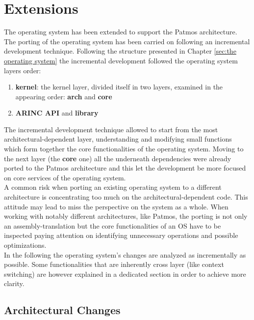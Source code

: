 \chapter{\os Extensions}

The \os operating system has been extended to support the Patmos architecture. The porting of the operating system has been carried on following an incremental development technique. Following the structure presented in Chapter \ref{sec:the operating system} the incremental development followed the operating system layers order:

\begin{enumerate}
	\item \textbf{kernel}: the kernel layer, divided itself in two layers, examined in the appearing order: \textbf{arch} and \textbf{core}
	\item \textbf{ARINC API} and \textbf{library}
\end{enumerate}

The incremental development technique allowed to start from the most architectural-dependent layer, understanding and modifying small functions which form together the core functionalities of the operating system. Moving to the next layer (the \textbf{core} one) all the underneath dependencies were already ported to the Patmos architecture and this let the development be more focused on core services of the operating system.\\

A common risk when porting an existing operating system to a different architecture is concentrating too much on the architectural-dependent code. This attitude may lead to miss the perspective on the system as a whole. When working with notably different architectures, like Patmos, the porting is not only an assembly-translation but the core functionalities of an OS have to be inspected paying attention on identifying unnecessary operations and possible optimizations.\\

In the following the operating system's changes are analyzed as incrementally as possible. Some functionalities that are inherently cross layer (like context switching) are however explained in a dedicated section in order to achieve more clarity.

\section{Architectural Changes}

